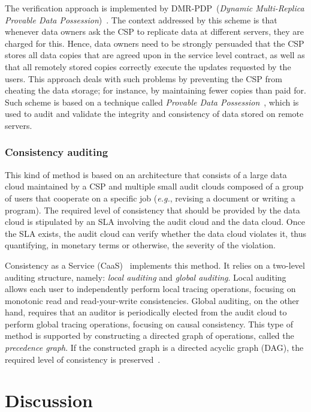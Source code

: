 The verification approach is implemented by DMR-PDP~(\textit{Dynamic Multi-Replica Provable Data Possession})~\cite{MukundanML12}. The context addressed by this scheme is that whenever data owners ask the CSP to replicate data at different servers, they are charged for this. Hence, data owners need to be strongly persuaded that the CSP stores all data copies that are agreed upon in the service level contract, as well as that all remotely stored copies correctly execute the updates requested by the users. 
This approach deals with such problems by preventing the CSP from cheating the data storage; for instance, by maintaining fewer copies than paid for. Such scheme is based on a technique called \textit{Provable Data Possession}~\cite{ateniese2007provable}, which is used to audit and validate the integrity and consistency of data stored on remote servers.

\subsubsection{Consistency auditing}

This kind of method is based on an architecture that consists of a large data cloud maintained by a CSP
and multiple small audit clouds composed of a group of users that cooperate on a specific job ({\it e.g.}, revising a document or writing a program). The required level of consistency that should be provided by the data cloud is stipulated by an SLA 
involving the audit cloud and the data cloud. Once the SLA exists, the audit cloud can verify whether the data cloud violates it, thus quantifying, in monetary terms or otherwise, the severity of the violation.

Consistency as a Service (CaaS)~\cite{liu2014consistency} implements this method. It relies on a two-level auditing structure, name\-ly: \textit{local auditing} and \textit{global auditing}. Local auditing allows each user to independently perform local tracing operations, focusing on monotonic read and read-your-write consistencies. Global auditing, on the other hand, requires that an auditor is periodically elected from the audit cloud to perform global tracing operations, focusing on causal consistency. This type of method is supported by constructing a directed graph of operations, called the \textit{precedence graph}. If the constructed graph is a directed acyclic graph (DAG), the required level of consistency is preserved~\cite{liu2014consistency}.

\section{Discussion}


